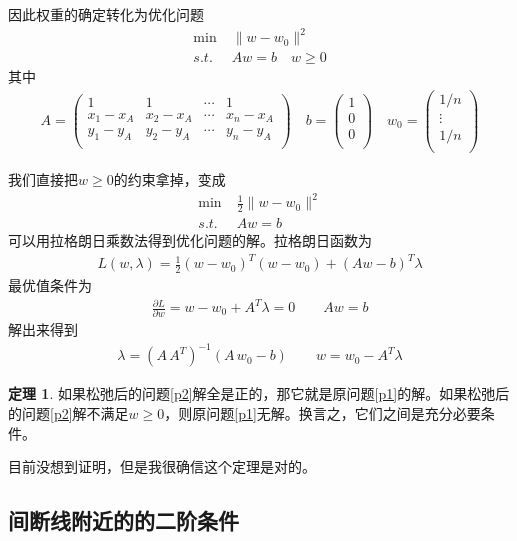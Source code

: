 \documentclass[12pt,a4paper]{article}
\theoremstyle{definition}
\newtheorem{theorem}{定理}
\begin{document}
因此权重的确定转化为优化问题
\begin{align}\label{p1}
\min & \; \|w - w_0\|^2 \\
s.t. & \; A w = b \quad w \geq 0
\end{align}
其中
\begin{align*}
A = \left(\begin{array}{cccc}
1 & 1 & \cdots & 1 \\
x_1 - x_A & x_2 - x_A & \cdots & x_n - x_A \\
y_1 - y_A & y_2 - y_A & \cdots & y_n - y_A \\
\end{array}\right)
\quad
b = \left(\begin{array}{c}
1 \\
0 \\
0 \\
\end{array}\right)
\quad
w_0 = \left(\begin{array}{c}
1/n \\
\vdots \\
1/n \\
\end{array}\right)
\end{align*}

我们直接把$w \geq 0$的约束拿掉，变成
\begin{align}\label{p2}
\min & \; \frac12 \|w - w_0\|^2 \\
s.t. & \; A w = b
\end{align}
可以用拉格朗日乘数法得到优化问题的解。拉格朗日函数为
\begin{align*}
L(w, \lambda) = \frac12 (w - w_0)^T (w - w_0) + (A w - b)^T \lambda
\end{align*}
最优值条件为
\begin{align*}
\frac{\partial L}{\partial w} = w - w_0 + A^T \lambda = 0 \qquad A w = b
\end{align*}
解出来得到
\begin{align*}
\lambda = (A \, A^T)^{-1} (A \, w_0 - b) \qquad w = w_0 - A^T \lambda
\end{align*}

\begin{theorem}
如果松弛后的问题\ref{p2}解全是正的，那它就是原问题\ref{p1}的解。如果松弛后的问题\ref{p2}解不满足$w \geq 0$，则原问题\ref{p1}无解。换言之，它们之间是充分必要条件。
\end{theorem}
目前没想到证明，但是我很确信这个定理是对的。

\subsection{间断线附近的的二阶条件}
\end{document}
